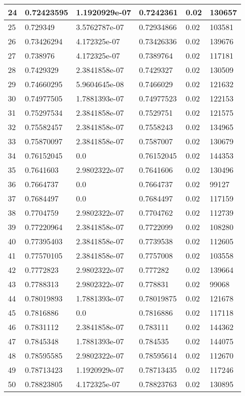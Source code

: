 \begin{longtable}{|l|l|l|l|l|l|}
24 & 0.72423595 & 1.1920929e-07 & 0.7242361 & 0.02 & 130657 \\ \hline 
25 & 0.729349 & 3.5762787e-07 & 0.72934866 & 0.02 & 103581 \\ \hline 
26 & 0.73426294 & 4.172325e-07 & 0.73426336 & 0.02 & 139676 \\ \hline 
27 & 0.738976 & 4.172325e-07 & 0.7389764 & 0.02 & 117181 \\ \hline 
28 & 0.7429329 & 2.3841858e-07 & 0.7429327 & 0.02 & 130509 \\ \hline 
29 & 0.74660295 & 5.9604645e-08 & 0.7466029 & 0.02 & 121632 \\ \hline 
30 & 0.74977505 & 1.7881393e-07 & 0.74977523 & 0.02 & 122153 \\ \hline 
31 & 0.75297534 & 2.3841858e-07 & 0.7529751 & 0.02 & 121575 \\ \hline 
32 & 0.75582457 & 2.3841858e-07 & 0.7558243 & 0.02 & 134965 \\ \hline 
33 & 0.75870097 & 2.3841858e-07 & 0.7587007 & 0.02 & 130679 \\ \hline 
34 & 0.76152045 & 0.0 & 0.76152045 & 0.02 & 144353 \\ \hline 
35 & 0.7641603 & 2.9802322e-07 & 0.7641606 & 0.02 & 130496 \\ \hline 
36 & 0.7664737 & 0.0 & 0.7664737 & 0.02 & 99127 \\ \hline 
37 & 0.7684497 & 0.0 & 0.7684497 & 0.02 & 117159 \\ \hline 
38 & 0.7704759 & 2.9802322e-07 & 0.7704762 & 0.02 & 112739 \\ \hline 
39 & 0.77220964 & 2.3841858e-07 & 0.7722099 & 0.02 & 108280 \\ \hline 
40 & 0.77395403 & 2.3841858e-07 & 0.7739538 & 0.02 & 112605 \\ \hline 
41 & 0.77570105 & 2.3841858e-07 & 0.7757008 & 0.02 & 103558 \\ \hline 
42 & 0.7772823 & 2.9802322e-07 & 0.777282 & 0.02 & 139664 \\ \hline 
43 & 0.7788313 & 2.9802322e-07 & 0.778831 & 0.02 & 99068 \\ \hline 
44 & 0.78019893 & 1.7881393e-07 & 0.78019875 & 0.02 & 121678 \\ \hline 
45 & 0.7816886 & 0.0 & 0.7816886 & 0.02 & 117118 \\ \hline 
46 & 0.7831112 & 2.3841858e-07 & 0.783111 & 0.02 & 144362 \\ \hline 
47 & 0.7845348 & 1.7881393e-07 & 0.784535 & 0.02 & 144075 \\ \hline 
48 & 0.78595585 & 2.9802322e-07 & 0.78595614 & 0.02 & 112670 \\ \hline 
49 & 0.78713423 & 1.1920929e-07 & 0.78713435 & 0.02 & 117246 \\ \hline 
50 & 0.78823805 & 4.172325e-07 & 0.78823763 & 0.02 & 130895 \\ \hline 
\end{longtable}